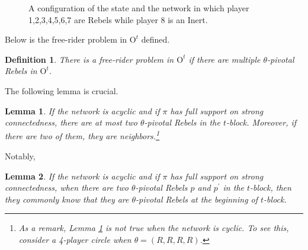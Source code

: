 \documentclass[12pt,letter]{article}
\newcommand{\Omicron}{\mathrm{O}}
\newtheorem{lemma}{Lemma}[section]
\newtheorem{definition}{Definition}[section]
\theoremstyle{definition}
\theoremstyle{remark}
\theoremstyle{claim}
\begin{document}
\begin{figure}

\label{fig:k-1_pivotal}
\begin{center}
\end{center}
\caption{A configuration of the state and the network in which player 1,2,3,4,5,6,7 are Rebels while player 8 is an Inert.}
\end{figure}

Below is the free-rider problem in $\Omicron^t$ defined.

\begin{definition}
There is a free-rider problem in $\Omicron^t$ if there are multiple $\theta$-pivotal Rebels in $\Omicron^t$.
\end{definition}



The following lemma is crucial. 
\begin{lemma}
\label{lemma_at_most_two_nodes}
If the network is acyclic and if $\pi$ has full support on strong connectedness, there are at most two $\theta$-pivotal Rebels in the $t$-block. Moreover, if there are two of them, they are neighbors.\footnote{As a remark, Lemma \ref{lemma_at_most_two_nodes} is not true when the network is cyclic. To see this, consider a 4-player circle when $\theta=(R,R,R,R)$.}
\end{lemma}

Notably,

\begin{lemma}
\label{lemman_pivotals_CK}
If the network is acyclic and if $\pi$ has full support on strong connectedness, when there are two $\theta$-pivotal Rebels $p$ and $p^{'}$ in the $t$-block, then they commonly know that they are $\theta$-pivotal Rebels at the beginning of $t$-block.
\end{lemma}
\end{document}
